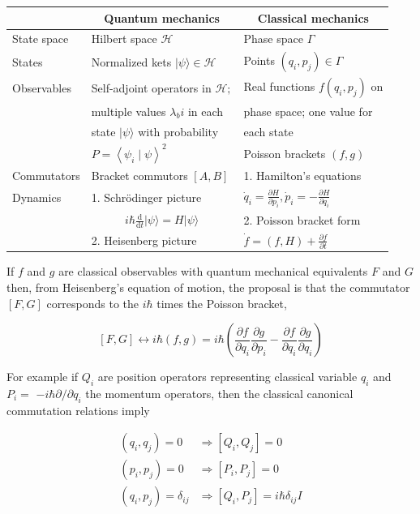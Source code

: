 \documentclass[10pt]{article}
\begin{document}
\begin{center}
\begin{tabular}{lll}
\hline\hline
 & \multicolumn{1}{c}{Quantum mechanics} & \multicolumn{1}{c}{Classical mechanics} \\
\hline
State space & Hilbert space $\mathcal{H}$ & Phase space $\Gamma$ \\
States & Normalized kets $|\psi\rangle \in \mathcal{H}$ & Points $\left(q_{i}, p_{j}\right) \in \Gamma$ \\
Observables & Self-adjoint operators in $\mathcal{H} ;$ & Real functions $f\left(q_{i}, p_{j}\right)$ on \\
 & multiple values $\lambda_{b} i$ in each & phase space; one value for \\
 & state $|\psi\rangle$ with probability & each state \\
 & $P=\left\langle\psi_{i} \mid \psi\right\rangle^{2}$ & Poisson brackets $(f, g)$ \\
Commutators & Bracket commutors $[A, B]$ & 1. Hamilton's equations \\
Dynamics & 1. Schrödinger picture & $\dot{q}_{i}=\frac{\partial H}{\partial p_{i}}, \dot{p}_{i}=-\frac{\partial H}{\partial q_{i}}$ \\
 & \multicolumn{1}{c}{$i \hbar \frac{\mathrm{d}}{\mathrm{d} t}|\psi\rangle=H|\psi\rangle$} & 2. Poisson bracket form \\
 & 2. Heisenberg picture & $\dot{f}=(f, H)+\frac{\partial f}{\partial t}$ \\
\hline\hline
\end{tabular}
\end{center}

If $f$ and $g$ are classical observables with quantum mechanical equivalents $F$ and $G$ then, from Heisenberg's equation of motion, the proposal is that the commutator $[F, G]$
corresponds to the $i \hbar$ times the Poisson bracket,

$$
[F, G] \longleftrightarrow i \hbar(f, g)=i \hbar\left(\frac{\partial f}{\partial q_{i}} \frac{\partial g}{\partial p_{i}}-\frac{\partial f}{\partial q_{i}} \frac{\partial g}{\partial q_{i}}\right)
$$

For example if $Q_{i}$ are position operators representing classical variable $q_{i}$ and $P_{i}=$ $-i \hbar \partial / \partial q_{i}$ the momentum operators, then the classical canonical commutation relations imply

$$
\begin{aligned}
\left(q_{i}, q_{j}\right)=0 & \Longrightarrow\left[Q_{i}, Q_{j}\right]=0 \\
\left(p_{i}, p_{j}\right)=0 & \Longrightarrow\left[P_{i}, P_{j}\right]=0 \\
\left(q_{i}, p_{j}\right)=\delta_{i j} & \Longrightarrow\left[Q_{i}, P_{j}\right]=i \hbar \delta_{i j} I
\end{aligned}
$$
\end{document}
